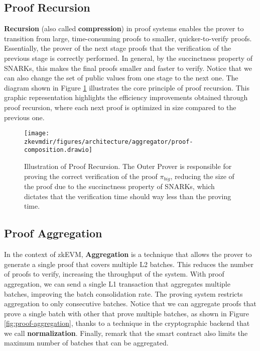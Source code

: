\subsection{Proof Recursion}

\textbf{Recursion} (also called \textbf{compression}) in proof systems enables the prover to transition from large, time-consuming proofs to smaller, quicker-to-verify proofs. Essentially, the prover of the next stage proofs that the verification of the previous stage is correctly performed. In general, by the succinctness property of SNARKs, this makes the final proofs smaller and faster to verify. Notice that we can also change the set of public values from one stage to the next one. The diagram shown in Figure \ref{fig:proof-recursion} illustrates the core principle of proof recursion. This graphic representation highlights the efficiency improvements obtained through proof recursion, where each next proof is optimized in size compared to the previous one.

\begin{figure}[H]
\centering
\texttt{[image: \\zkevmdir/figures/architecture/aggregator/proof-composition.drawio]}
\caption{Illustration of Proof Recursion. The Outer Prover is responsible for proving the correct verification of the proof $\pi_{big}$, reducing the size of the proof due to the succinctness property of SNARKs, which dictates that the verification time should way less than the proving time.}
\label{fig:proof-recursion}
\end{figure}




\subsection{Proof Aggregation}

In the context of zkEVM, \textbf{Aggregation} is a technique that allows the prover to generate a single proof that covers multiple L2 batches. This reduces the number of proofs to verify, increasing the throughput of the system. With proof aggregation, we can send a single L1 transaction that aggregates multiple batches, improving the batch consolidation rate. The proving system restricts aggregation to only consecutive batches. Notice that we can aggregate proofs that prove a single batch with other that prove multiple batches, as shown in Figure \ref{fig:proof-aggregation}, thanks to a technique in the cryptographic backend that we call \textbf{normalization}. Finally, remark that the smart contract also limits the maximum number of batches that can be aggregated.

